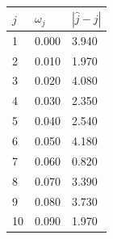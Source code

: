 \begin{tabular}{|l|l|l|}
\hline
$j$ & $\omega_j$ & $|\hat j-j|$ \\
\hline
1 & 0.000 & 3.940 \\
\hline
2 & 0.010 & 1.970 \\
\hline
3 & 0.020 & 4.080 \\
\hline
4 & 0.030 & 2.350 \\
\hline
5 & 0.040 & 2.540 \\
\hline
6 & 0.050 & 4.180 \\
\hline
7 & 0.060 & 0.820 \\
\hline
8 & 0.070 & 3.390 \\
\hline
9 & 0.080 & 3.730 \\
\hline
10 & 0.090 & 1.970 \\
\hline
\end{tabular}
